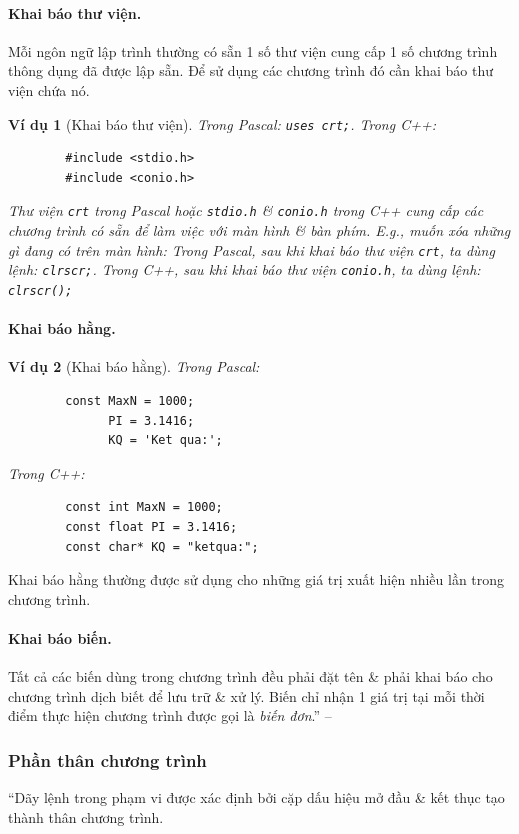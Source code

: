 \documentclass[oneside]{book}
\numberwithin{equation}{section}
\newtheorem{vidu}{Ví dụ}[section]
\begin{document}
\paragraph{Khai báo thư viện.} Mỗi ngôn ngữ lập trình thường có sẵn 1 số thư viện cung cấp 1 số chương trình thông dụng đã được lập sẵn. Để sử dụng các chương trình đó cần khai báo thư viện chứa nó.

\begin{vidu}[Khai báo thư viện]
	Trong Pascal: \verb|uses crt;|. Trong \emph{C++}:
	\begin{verbatim}
		#include <stdio.h>
		#include <conio.h>
	\end{verbatim}
	Thư viện \verb|crt| trong Pascal hoặc \verb|stdio.h| \& \verb|conio.h| trong \emph{C++} cung cấp các chương trình có sẵn để làm việc với màn hình \& bàn phím. E.g., muốn xóa những gì đang có trên màn hình: Trong Pascal, sau khi khai báo thư viện \verb|crt|, ta dùng lệnh: \verb|clrscr;|. Trong \emph{C++}, sau khi khai báo thư viện \verb|conio.h|, ta dùng lệnh: \verb|clrscr();|
\end{vidu}

\paragraph{Khai báo hằng.}
\begin{vidu}[Khai báo hằng]
	Trong Pascal:
	\begin{verbatim}
		const MaxN = 1000;
		      PI = 3.1416;
		      KQ = 'Ket qua:';
	\end{verbatim}
	Trong \emph{C++}:
	\begin{verbatim}
		const int MaxN = 1000;
		const float PI = 3.1416;
		const char* KQ = "ketqua:";
	\end{verbatim}
\end{vidu}
Khai báo hằng thường được sử dụng cho những giá trị xuất hiện nhiều lần trong chương trình.

\paragraph{Khai báo biến.} Tất cả các biến dùng trong chương trình đều phải đặt tên \& phải khai báo cho chương trình dịch biết để lưu trữ \& xử lý. Biến chỉ nhận 1 giá trị tại mỗi thời điểm thực hiện chương trình được gọi là \textit{biến đơn}.'' -- \cite[pp. 18--19]{SGK_Tin_Hoc_11}

\subsubsection{Phần thân chương trình}
``Dãy lệnh trong phạm vi được xác định bởi cặp dấu hiệu mở đầu \& kết thục tạo thành thân chương trình.
\end{document}
